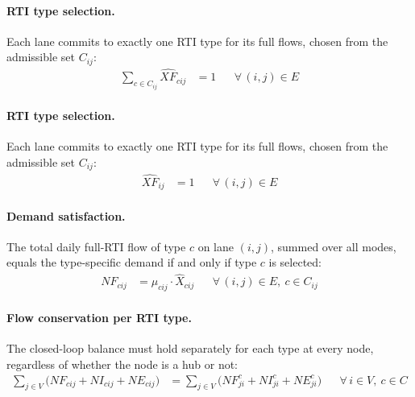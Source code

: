 \paragraph{RTI type selection.}
Each lane commits to exactly one RTI type for its full flows,
chosen from the admissible set $C_{ij}$:
%
\begin{align}
  \sum_{c \in C_{ij}} \widehat{XF}_{cij} &= 1
  && \forall\,(i,j) \in E
  \label{eq:type-selection}
\end{align}
\paragraph{RTI type selection.}
Each lane commits to exactly one RTI type for its full flows,
chosen from the admissible set $C_{ij}$:
%
\begin{align}
  \widehat{XF}_{ij} &= 1
  && \forall\,(i,j) \in E
  \label{eq:type-selection}
\end{align}



\paragraph{Demand satisfaction.}
The total daily full-RTI flow of type $c$ on lane $(i,j)$,
summed over all modes, equals the type-specific demand if and
only if type $c$ is selected:
%
\begin{align}
  NF_{cij}
  &= \mu_{cij} \cdot \hat{X}_{cij}
  && \forall\,(i,j)\in E,\ c\in C_{ij}
  \label{eq:demand}
\end{align}


\paragraph{Flow conservation per RTI type.}
The closed-loop balance must hold separately for each type at every
node, regardless of whether the node is a hub or not:
%
\begin{align}
  \sum_{j\in V}\!\bigl(NF_{cij}+NI_{cij}+NE_{cij}\bigr)
  &=
  \sum_{j\in V}\!\bigl(NF^{c}_{ji}+NI^{c}_{ji}+NE^{c}_{ji}\bigr)
  && \forall\, i\in V,\ c\in C
  \label{eq:conservation}
\end{align}


